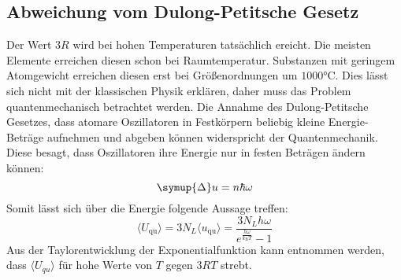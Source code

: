 \subsection{Abweichung vom Dulong-Petitsche Gesetz}
Der Wert $3R$ wird bei hohen Temperaturen tatsächlich ereicht.
Die meisten Elemente erreichen diesen schon bei Raumtemperatur.
Substanzen mit geringem Atomgewicht erreichen diesen erst bei
Größenordnungen um $1000\si{\celsius}$.
Dies lässt sich nicht mit der klassischen Physik erklären,
daher muss das Problem quantenmechanisch betrachtet werden.
Die Annahme des Dulong-Petitsche Gesetzes, dass atomare Oszillatoren in Festkörpern
beliebig kleine Energie-Beträge aufnehmen und abgeben können widerspricht der Quantenmechanik.
Diese besagt, dass Oszillatoren ihre Energie nur in festen Beträgen ändern können:
\begin{equation}
\symup{\Delta} u = n \hbar \omega
\end{equation}
Somit lässt sich über die Energie folgende Aussage treffen:
\begin{equation}
\langle U_\text{qu} \rangle = 3 N_L \langle u_\text{qu} \rangle = \frac{3 N_L h
\omega}{e^{\frac{h\omega}{k_\text{B}T}}-1}
\end{equation}
Aus der Taylorentwicklung der Exponentialfunktion kann entnommen werden,
dass $\langle U_{qu} \rangle$ für hohe Werte von $T$ gegen $3RT$ strebt.
